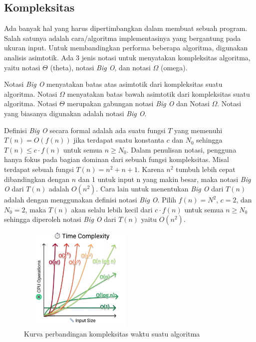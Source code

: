 \documentclass[conference]{IEEEtran}
\begin{document}
\subsection{Kompleksitas}
Ada banyak hal yang harus dipertimbangkan dalam membuat sebuah program.
Salah satunya adalah cara/algoritma implementasinya yang bergantung pada ukuran input.
Untuk membandingkan performa beberapa algoritma, digunakan analisis asimtotik.
Ada 3 jenis notasi untuk menyatakan kompleksitas algoritma, yaitu notasi $\Theta$ (theta), notasi \textit{Big O}, dan notasi $\Omega$ (omega).

Notasi \textit{Big O} menyatakan batas atas asimtotik dari kompleksitas suatu algoritma.
Notasi $\Omega$ menyatakan batas bawah asimtotik dari kompleksitas suatu algoritma.
Notasi $\Theta$ merupakan gabungan notasi \textit{Big O} dan Notasi $\Omega$.
Notasi yang biasanya digunakan adalah notasi \textit{Big O}.

Definisi \textit{Big O} secara formal adalah ada suatu fungsi $T$ yang memenuhi
$T(n) = O(f(n))$ jika terdapat suatu konstanta $c$ dan $N_0$ sehingga $T(n) \le c \cdot f(n)$ untuk semua $n \ge N_0$.
Dalam penulisan notasi, pengguna hanya fokus pada bagian dominan dari sebuah fungsi kompleksitas.
Misal terdapat sebuah fungsi $T(n) = n^2 + n + 1$.
Karena $n^2$ tumbuh lebih cepat dibandingkan dengan $n$ dan 1 untuk input n yang makin besar, 
maka notasi \textit{Big O} dari $T(n)$ adalah $O(n^2)$.
Cara lain untuk menentukan \textit{Big O} dari $T(n)$ adalah dengan menggunakan definisi notasi \textit{Big O}.
Pilih $f(n) = N^2$, $c = 2$, dan $N_0 = 2$, maka $T(n)$ akan selalu lebih kecil dari $c \cdot f(n)$ untuk semua $n \ge N_0$ 
sehingga diperoleh notasi \textit{Big O} dari $T(n)$ yaitu $O(n^2)$.

\begin{figure}[h]
    \includegraphics[width = 6cm, height = 5cm]{Kurva_Kompleksitas_Waktu.png}
    \centering
    \caption{Kurva perbandingan kompleksitas waktu suatu algoritma}
\end{figure}
\end{document}
